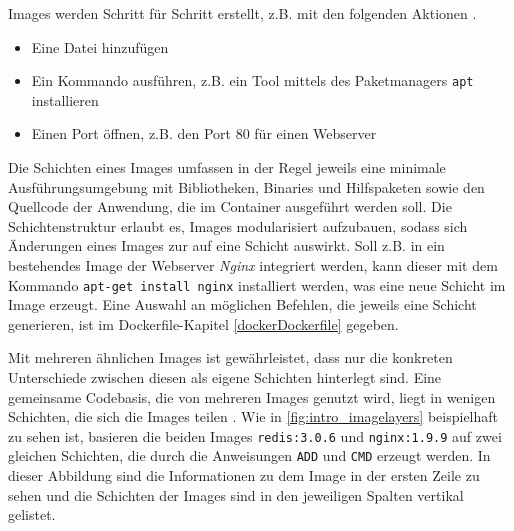 \documentclass[../main.tex]{subfiles}
\begin{document}
			Images werden Schritt für Schritt erstellt, z.B. mit den folgenden Aktionen \cite[S.11]{dockerBook}.
			\begin{itemize}
				\item Eine Datei hinzufügen
				\item Ein Kommando ausführen, z.B. ein Tool mittels des Paketmanagers \texttt{apt} installieren
				\item Einen Port öffnen, z.B. den Port 80 für einen Webserver
			\end{itemize}

      Die Schichten eines Images umfassen in der Regel jeweils eine minimale Ausführungsumgebung mit Bibliotheken, Binaries und Hilfspaketen sowie den Quellcode der Anwendung, die im Container ausgeführt werden soll. Die Schichtenstruktur erlaubt es, Images modularisiert aufzubauen, sodass sich Änderungen eines Images zur auf eine Schicht auswirkt. Soll z.B. in ein bestehendes Image der Webserver \emph{Nginx} integriert werden, kann dieser mit dem Kommando \texttt{apt-get install nginx} installiert werden, was eine neue Schicht im Image erzeugt. Eine Auswahl an möglichen Befehlen, die jeweils eine Schicht generieren, ist im Dockerfile-Kapitel \ref{dockerDockerfile} gegeben.

			Mit mehreren ähnlichen Images ist gewährleistet, dass nur die konkreten Unterschiede zwischen diesen als eigene Schichten hinterlegt sind. Eine gemeinsame Codebasis, die von mehreren Images genutzt wird, liegt in wenigen Schichten, die sich die Images teilen \cite[S.3]{dockerIntroIEEE}. Wie in \fig \ref{fig:intro_imagelayers} beispielhaft zu sehen ist, basieren die beiden Images \texttt{redis:3.0.6} und \texttt{nginx:1.9.9} auf zwei gleichen Schichten, die durch die Anweisungen \texttt{ADD} und \texttt{CMD} erzeugt werden. In dieser Abbildung sind die Informationen zu dem Image in der ersten Zeile zu sehen und die Schichten der Images sind in den jeweiligen Spalten vertikal gelistet.
\end{document}
